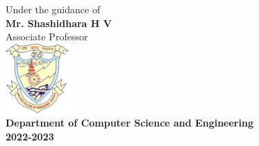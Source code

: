 \begin{titlepage}
\begin{center}
\vspace{0.6cm}
Under the guidance of\\
{\textbf{Mr. Shashidhara H V}}\\
Associate Professor\\
\vspace{1cm}
\includegraphics[width=0.18\textwidth]{./mce_logo.png}\\[0.1in]



\Large{\bf Department of Computer Science and Engineering}\\


\bf 2022-2023

\end{center}

\end{titlepage}
